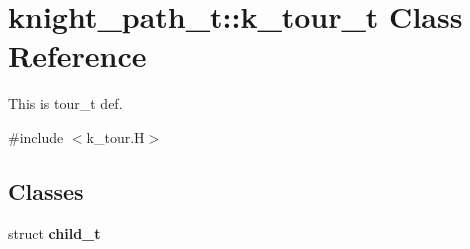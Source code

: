 \hypertarget{classknight__path__t_1_1k__tour__t}{\section{knight\-\_\-path\-\_\-t\-:\-:k\-\_\-tour\-\_\-t \-Class \-Reference}
\label{classknight__path__t_1_1k__tour__t}
}


\-This is tour\-\_\-t def.  




{\ttfamily \#include $<$k\-\_\-tour.\-H$>$}

\subsection*{\-Classes}
\begin{DoxyCompactItemize}
\item 
struct {\bfseries child\-\_\-t}
\end{DoxyCompactItemize}

